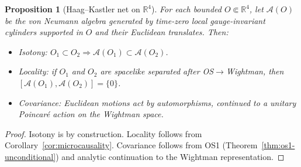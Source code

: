 \documentclass[11pt]{amsart}
\theoremstyle{plain}
\newtheorem{proposition}[theorem]{Proposition}
\theoremstyle{definition}
\theoremstyle{remark}
\begin{document}
\begin{proposition}[Haag--Kastler net on $\mathbb R^4$]\label{prop:haag-kastler}
For each bounded $O\Subset\mathbb R^4$, let $\mathcal A(O)$ be the von Neumann algebra generated by time-zero local gauge-invariant cylinders supported in $O$ and their Euclidean translates. Then:
\begin{itemize}
  \item Isotony: $O_1\subset O_2\Rightarrow \mathcal A(O_1)\subset \mathcal A(O_2)$.
  \item Locality: if $O_1$ and $O_2$ are spacelike separated after OS$\to$Wightman, then $[\mathcal A(O_1),\mathcal A(O_2)]=\{0\}$.
  \item Covariance: Euclidean motions act by automorphisms, continued to a unitary Poincar\'e action on the Wightman space.
\end{itemize}
\end{proposition}
\begin{proof}
Isotony is by construction. Locality follows from Corollary~\ref{cor:microcausality}. Covariance follows from OS1 (Theorem~\ref{thm:os1-unconditional}) and analytic continuation to the Wightman representation.
\end{proof}
\end{document}
